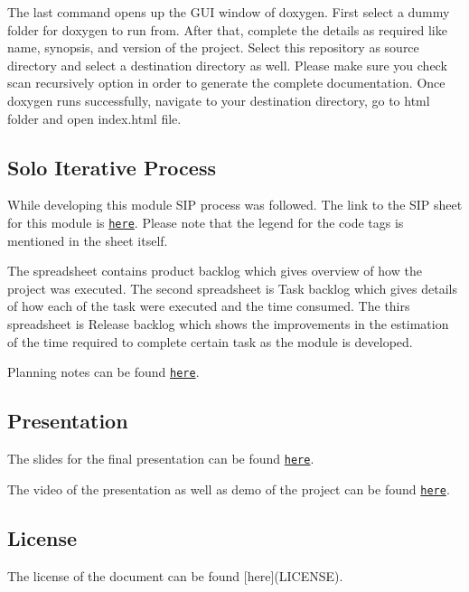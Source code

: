 The last command opens up the G\+UI window of doxygen. First select a dummy folder for doxygen to run from. After that, complete the details as required like name, synopsis, and version of the project. Select this repository as source directory and select a destination directory as well. Please make sure you check scan recursively option in order to generate the complete documentation. Once doxygen runs successfully, navigate to your destination directory, go to html folder and open index.\+html file.

\subsection*{\label{_sip}%
 Solo Iterative Process}

While developing this module S\+IP process was followed. The link to the S\+IP sheet for this module is \href{https://docs.google.com/spreadsheets/d/11tZz-o4cJSky1bMGR0uIQGLcoGgMJUM74vtqE4XKSQ8/edit?usp=sharing}{\tt here}. Please note that the legend for the code tags is mentioned in the sheet itself.

The spreadsheet contains product backlog which gives overview of how the project was executed. The second spreadsheet is Task backlog which gives details of how each of the task were executed and the time consumed. The thirs spreadsheet is Release backlog which shows the improvements in the estimation of the time required to complete certain task as the module is developed.

Planning notes can be found \href{https://docs.google.com/document/d/1XSsnkajWHP6XwBxO1Zjkb_wmKyFWa5k23H9Gzb1IpiQ/edit?usp=sharing}{\tt here}.

\subsection*{\label{_present}%
 Presentation}

The slides for the final presentation can be found \href{https://docs.google.com/presentation/d/1I7c-rBKHdLnsbCT6sVaDmLgEeXg7oTwyJsZUmdR4C7E/edit?usp=sharing}{\tt here}.

The video of the presentation as well as demo of the project can be found \href{https://youtu.be/Qogoys-AiRE}{\tt here}.

\subsection*{\label{_lic}%
 License}

The license of the document can be found \mbox{[}here\mbox{]}(L\+I\+C\+E\+N\+SE). 